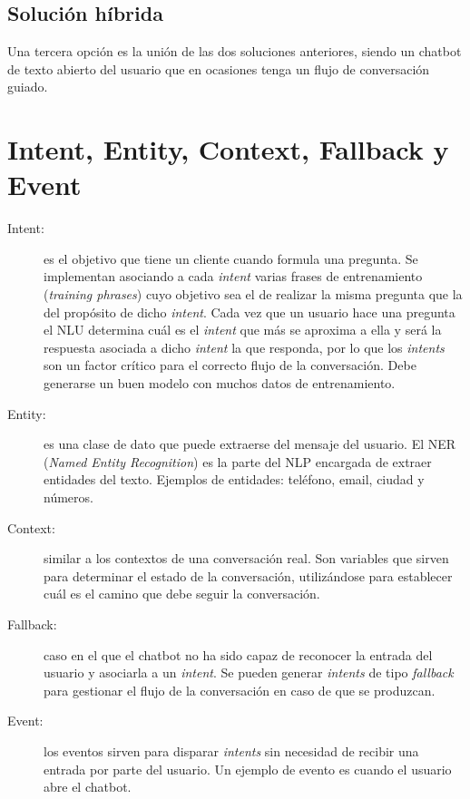 \subsection{Solución híbrida}
Una tercera opción es la unión de las dos soluciones anteriores, siendo un chatbot de texto abierto del usuario que en ocasiones tenga un flujo de conversación guiado.

\newpage

\section{Intent, Entity, Context, Fallback y Event}

\begin{description}
	\item[Intent:] es el objetivo que tiene un cliente cuando formula una pregunta. Se implementan asociando a cada \textit{intent} varias frases de entrenamiento (\textit{training phrases}) cuyo objetivo sea el de realizar la misma pregunta que la del propósito de dicho \textit{intent}. Cada vez que un usuario hace una pregunta el NLU determina cuál es el \textit{intent} que más se aproxima a ella y será la respuesta asociada a dicho \textit{intent} la que responda, por lo que los \textit{intents} son un factor crítico para el correcto flujo de la conversación.
	Debe generarse un buen modelo con muchos datos de entrenamiento. \cite{Intents}
	\item[Entity:] es una clase de dato que puede extraerse del mensaje del usuario. El NER (\textit{Named Entity Recognition}) es la parte del NLP encargada de extraer entidades del texto. Ejemplos de entidades: teléfono, email, ciudad y números.
	\item[Context:] similar a los contextos de una conversación real. Son variables que sirven para determinar el estado de la conversación, utilizándose para establecer cuál es el camino que debe seguir la conversación. \cite{DialogflowDocs}
	\item[Fallback:] caso en el que el chatbot no ha sido capaz de reconocer la entrada del usuario y asociarla a un \textit{intent}. Se pueden generar \textit{intents} de tipo \textit{fallback} para gestionar el flujo de la conversación en caso de que se produzcan.
	\item[Event:] los eventos sirven para disparar \textit{intents} sin necesidad de recibir una entrada por parte del usuario. Un ejemplo de evento es cuando el usuario abre el chatbot.
\end{description}

